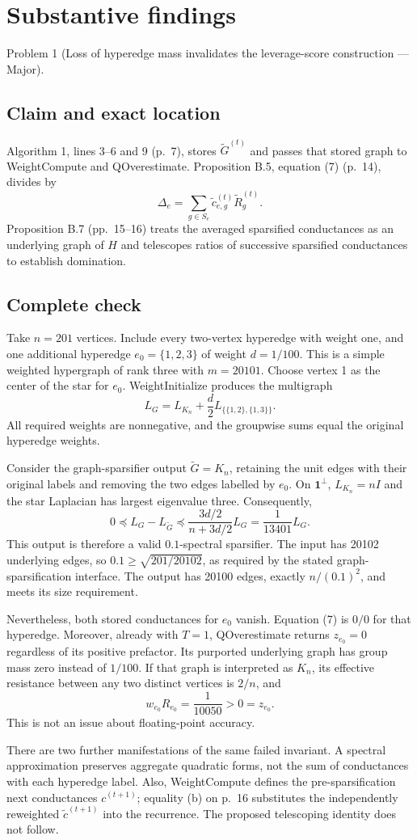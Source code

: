 \documentclass[10pt]{article}
\begin{document}
\section*{Substantive findings}
Problem 1 (Loss of hyperedge mass invalidates the leverage-score construction — Major).\par
\subsection*{Claim and exact location}
Algorithm 1, lines 3–6 and 9 (p. 7), stores \(\widetilde G^{(t)}\) and passes that stored graph to WeightCompute and QOverestimate. Proposition B.5, equation (7) (p. 14), divides by \[\Delta_e=\sum_{g\in S_e}\widetilde c_{e,g}^{(t)}\widetilde R_g^{(t)}.\] Proposition B.7 (pp. 15–16) treats the averaged sparsified conductances as an underlying graph of \(H\) and telescopes ratios of successive sparsified conductances to establish domination.\par
\subsection*{Complete check}
Take \(n=201\) vertices. Include every two-vertex hyperedge with weight one, and one additional hyperedge \(e_0=\{1,2,3\}\) of weight \(d=1/100\). This is a simple weighted hypergraph of rank three with \(m=20101\). Choose vertex 1 as the center of the star for \(e_0\). WeightInitialize produces the multigraph \[L_G=L_{K_n}+\frac d2 L_{\{\{1,2\},\{1,3\}\}}.\] All required weights are nonnegative, and the groupwise sums equal the original hyperedge weights.\par
Consider the graph-sparsifier output \(\widetilde G=K_n\), retaining the unit edges with their original labels and removing the two edges labelled by \(e_0\). On \(\mathbf1^\perp\), \(L_{K_n}=nI\) and the star Laplacian has largest eigenvalue three. Consequently, \[0\preceq L_G-L_{\widetilde G}\preceq
 \frac{3d/2}{n+3d/2}L_G=\frac1{13401}L_G.\] This output is therefore a valid \(0.1\)-spectral sparsifier. The input has 20102 underlying edges, so \(0.1\ge\sqrt{201/20102}\), as required by the stated graph-sparsification interface. The output has 20100 edges, exactly \(n/(0.1)^2\), and meets its size requirement.\par
Nevertheless, both stored conductances for \(e_0\) vanish. Equation (7) is \(0/0\) for that hyperedge. Moreover, already with \(T=1\), QOverestimate returns \(z_{e_0}=0\) regardless of its positive prefactor. Its purported underlying graph has group mass zero instead of \(1/100\). If that graph is interpreted as \(K_n\), its effective resistance between any two distinct vertices is \(2/n\), and \[w_{e_0}R_{e_0}=\frac1{10050}>0=z_{e_0}.\] This is not an issue about floating-point accuracy.\par
There are two further manifestations of the same failed invariant. A spectral approximation preserves aggregate quadratic forms, not the sum of conductances with each hyperedge label. Also, WeightCompute defines the pre-sparsification next conductances \(c^{(t+1)}\); equality (b) on p. 16 substitutes the independently reweighted \(\widetilde c^{(t+1)}\) into the recurrence. The proposed telescoping identity does not follow.\par
\end{document}
